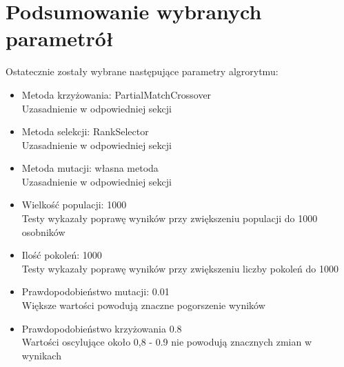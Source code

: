 \documentclass[12pt,a4paper]{article}
\begin{document}
\section{Podsumowanie wybranych parametrół}
Ostatecznie zostały wybrane następujące parametry algrorytmu:
\begin{itemize}
\item Metoda krzyżowania: PartialMatchCrossover\\
Uzasadnienie w odpowiedniej sekcji
\item Metoda selekcji: RankSelector\\
Uzasadnienie w odpowiedniej sekcji
\item Metoda mutacji: własna metoda\\
Uzasadnienie w odpowiedniej sekcji
\item Wielkość populacji: 1000\\
Testy wykazały poprawę wyników przy zwiększeniu populacji do 1000 osobników
\item Ilość pokoleń: 1000\\
Testy wykazały poprawę wyników przy zwiększeniu liczby pokoleń do 1000
\item Prawdopodobieństwo mutacji: 0.01\\
Większe wartości powodują znaczne pogorszenie wyników
\item Prawdopodobieństwo krzyżowania 0.8\\
Wartości oscylujące około 0,8 - 0.9 nie powodują znacznych zmian w wynikach
\end{itemize}
\end{document}
